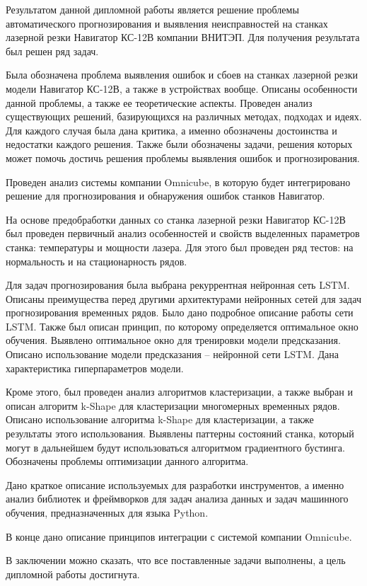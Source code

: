 
Результатом данной дипломной работы является решение проблемы
автоматического прогнозирования и выявления неисправностей
на станках лазерной резки Навигатор КС-12В компании ВНИТЭП.
Для получения результата был решен ряд задач.

Была обозначена проблема выявления ошибок и сбоев на станках лазерной резки модели Навигатор КС-12В,
а также в устройствах вообще.
Описаны особенности данной проблемы, а также ее теоретические аспекты. Проведен анализ
существующих решений, базирующихся на различных методах, подходах и идеях.
Для каждого случая была дана критика, а именно обозначены достоинства и недостатки каждого решения.
Также были обозначены задачи, решения которых может помочь достичь решения проблемы выявления ошибок и прогнозирования.

Проведен анализ системы компании Omnicube, в которую
будет интегрировано решение для прогнозирования и обнаружения ошибок станков Навигатор.

На основе предобработки данных со станка лазерной резки Навигатор КС-12В
был проведен первичный анализ особенностей и свойств выделенных параметров станка:
температуры и мощности лазера.
Для этого был проведен ряд тестов: на нормальность и на стационарность рядов.


Для задач прогнозирования была выбрана рекуррентная нейронная сеть LSTM.
Описаны преимущества перед другими архитектурами нейронных сетей
для задач прогнозирования временных рядов.
Было дано подробное описание работы сети LSTM.
Также был описан принцип, по которому определяется оптимальное окно обучения.
Выявлено оптимальное окно для тренировки модели предсказания.
Описано использование модели предсказания -- нейронной сети LSTM.
Дана характеристика гиперпараметров модели.


Кроме этого, был проведен анализ алгоритмов кластеризации,
а также выбран и описан алгоритм k-Shape для кластеризации многомерных временных рядов.
Описано использование алгоритма k-Shape для кластеризации,
а также результаты этого использования.
Выявлены паттерны состояний станка, который могут
в дальнейшем будут использоваться алгоритмом градиентного бустинга.
Обозначены проблемы оптимизации данного алгоритма.

Дано краткое описание используемых для разработки инструментов,
а именно анализ библиотек и фреймворков для задач анализа данных и задач машинного обучения,
предназначенных для языка Python.

В конце дано описание принципов интеграции с системой компании Omnicube.

В заключении можно сказать, что все поставленные задачи выполнены,
а цель дипломной работы достигнута.

\clearpage
